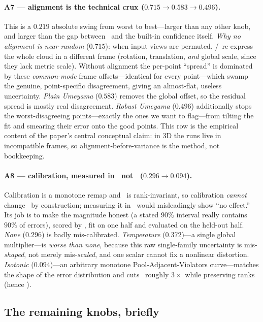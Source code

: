 \paragraph{A7 --- alignment is the technical crux ($0.715\to0.583\to0.496$).} This is a $0.219$
absolute swing from worst to best---larger than any other knob, and larger than the gap between
\trustr\ and the built-in confidence itself. \emph{Why no alignment is near-random} ($0.715$): when
input views are permuted, \vggt/\mastr\ re-express the whole cloud in a different frame (rotation,
translation, \emph{and} global scale, since they lack metric scale). Without alignment the per-point
``spread'' is dominated by these \emph{common-mode} frame offsets---identical for every point---which
swamp the genuine, point-specific disagreement, giving an almost-flat, useless uncertainty.
\emph{Plain Umeyama} ($0.583$) removes the global offset, so the residual spread is mostly real
disagreement. \emph{Robust Umeyama} ($0.496$) additionally stops the worst-disagreeing
points---exactly the ones we want to flag---from tilting the fit and smearing their error onto the
good points. This row is the empirical content of the paper's central conceptual claim: in 3D the
runs live in incompatible frames, so alignment-before-variance is the method, not bookkeeping.

\paragraph{A8 --- calibration, measured in \ece\ not \ause\ ($0.296\to0.094$).} Calibration is a
monotone remap and \ause\ is rank-invariant, so calibration \emph{cannot} change \ause\ by
construction; measuring it in \ause\ would misleadingly show ``no effect.'' Its job is to make the
magnitude honest (a stated $90\%$ interval really contains $90\%$ of errors), scored by \ece, fit on
one half and evaluated on the held-out half. \emph{None} ($0.296$) is badly mis-calibrated.
\emph{Temperature} ($0.372$)---a single global multiplier---is \emph{worse than none}, because this
raw single-family uncertainty is mis-\emph{shaped}, not merely mis-\emph{scaled}, and one scalar
cannot fix a nonlinear distortion. \emph{Isotonic} ($0.094$)---an arbitrary monotone
Pool-Adjacent-Violators curve---matches the shape of the error distribution and cuts \ece\ roughly
$3\times$ while preserving ranks (hence \ause).

\subsection{The remaining knobs, briefly}
\label{sec:abl-rest}

